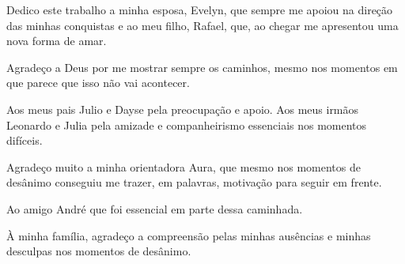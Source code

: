 \begin{flushright}
{\em 
    
    Dedico este trabalho a minha esposa, Evelyn, que sempre me apoiou na direção das minhas conquistas e ao meu filho, Rafael, que, ao chegar me apresentou uma nova forma de amar.
}
\end{flushright}
\newpage


\hspace{5mm}
Agradeço a Deus por me mostrar sempre os caminhos, mesmo nos momentos em que parece que isso não vai acontecer. 

Aos meus pais Julio e Dayse pela preocupação e apoio. Aos meus irmãos Leonardo e Julia pela amizade e companheirismo essenciais nos momentos difíceis.

Agradeço muito a minha orientadora Aura, que mesmo nos momentos de desânimo conseguiu me trazer, em palavras, motivação para seguir em frente.

Ao amigo André que foi essencial em parte dessa caminhada.

À minha família, agradeço a compreensão pelas minhas ausências e minhas desculpas nos momentos de desânimo.



